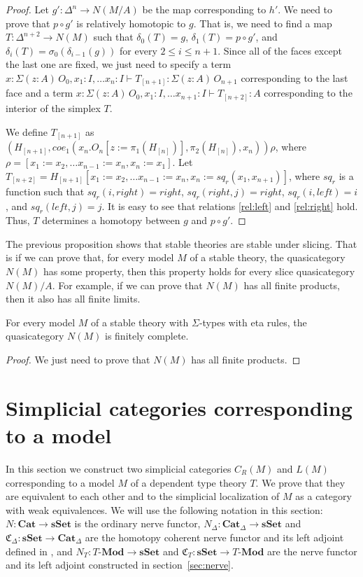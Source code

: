 \documentclass[reqno]{amsart}
\theoremstyle{definition}
\theoremstyle{remark}
\newcommand{\repl}{:=}
\newcommand{\cat}[1]{\mathbf{#1}}
\newcommand{\Cat}{\cat{Cat}}
\newcommand{\Mod}[1]{#1\text{-}\cat{Mod}}
\newcommand{\sSet}{\cat{sSet}}
\numberwithin{figure}{section}
\begin{document}
\begin{proof}
Let $g' : \Delta^n \to N(M/A)$ be the map corresponding to $h'$.
We need to prove that $p \circ g'$ is relatively homotopic to $g$.
That is, we need to find a map $T : \Delta^{n+2} \to N(M)$ such that $\delta_0(T) = g$, $\delta_1(T) = p \circ g'$,
and $\delta_i(T) = \sigma_0(\delta_{i-1}(g))$ for every $2 \leq i \leq n+1$.
Since all of the faces except the last one are fixed, we just need to specify a term $x : \Sigma (z : A)\,O_0, x_1 : I, \ldots x_n : I \vdash T_{[n+1]} : \Sigma (z : A)\,O_{n+1}$
corresponding to the last face and a term $x : \Sigma (z : A)\,O_0, x_1 : I, \ldots x_{n+1} : I \vdash T_{[n+2]} : A$ corresponding to the interior of the simplex $T$.

We define $T_{[n+1]}$ as $(H_{[n+1]}, coe_1(x_n.O_n[z \repl \pi_1(H_{[n]})], \pi_2(H_{[n]}), x_n))\rho$, where $\rho = [x_1 \repl x_2, \ldots x_{n-1} \repl x_n, x_n \repl x_1]$.
Let $T_{[n+2]} = H_{[n+1]}[x_1 \repl x_2, \ldots x_{n-1} \repl x_n, x_n \repl sq_r(x_1, x_{n+1})]$,
where $sq_r$ is a function such that $sq_r(i,right) = right$, $sq_r(right,j) = right$, $sq_r(i,left) = i$, and $sq_r(left,j) = j$.
It is easy to see that relations \eqref{rel:left} and \eqref{rel:right} hold.
Thus, $T$ determines a homotopy between $g$ and $p \circ g'$.
\end{proof}

The previous proposition shows that stable theories are stable under slicing.
That is if we can prove that, for every model $M$ of a stable theory, the quasicategory $N(M)$ has some property,
then this property holds for every slice quasicategory $N(M)/A$.
For example, if we can prove that $N(M)$ has all finite products, then it also has all finite limits.

\begin{prop}
For every model $M$ of a stable theory with $\Sigma$-types with eta rules, the quasicategory $N(M)$ is finitely complete.
\end{prop}
\begin{proof}
We just need to prove that $N(M)$ has all finite products.
\end{proof}

\section{Simplicial categories corresponding to a model}

In this section we construct two simplicial categories $C_R(M)$ and $L(M)$ corresponding to a model $M$ of a dependent type theory $T$.
We prove that they are equivalent to each other and to the simplicial localization of $M$ as a category with weak equivalences.
We will use the following notation in this section: $N : \Cat \to \sSet$ is the ordinary nerve functor,
$N_\Delta : \Cat_\Delta \to \sSet$ and $\mathfrak{C}_\Delta : \sSet \to \Cat_\Delta$ are the homotopy coherent nerve functor and its left adjoint defined in \cite{lurie-topos},
and $N_T : \Mod{T} \to \sSet$ and $\mathfrak{C}_T : \sSet \to \Mod{T}$ are the nerve functor and its left adjoint constructed in section~\ref{sec:nerve}.
\end{document}
